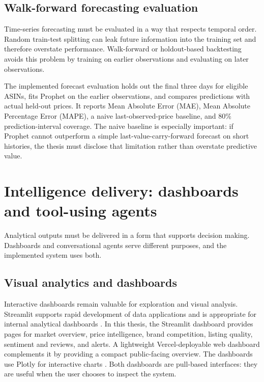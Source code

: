 \subsection{Walk-forward forecasting evaluation}

Time-series forecasting must be evaluated in a way that respects
temporal order. Random train-test splitting can leak future information
into the training set and therefore overstate performance. Walk-forward
or holdout-based backtesting avoids this problem by training on earlier
observations and evaluating on later observations.

The implemented forecast evaluation holds out the final three days for
eligible ASINs, fits Prophet on the earlier observations, and compares
predictions with actual held-out prices. It reports Mean Absolute Error
(MAE), Mean Absolute Percentage Error (MAPE), a naive last-observed-price
baseline, and 80\% prediction-interval coverage. The naive baseline is
especially important: if Prophet cannot outperform a simple
last-value-carry-forward forecast on short histories, the thesis must
disclose that limitation rather than overstate predictive value.

\section{Intelligence delivery: dashboards and tool-using agents}

Analytical outputs must be delivered in a form that supports decision
making. Dashboards and conversational agents serve different purposes,
and the implemented system uses both.

\subsection{Visual analytics and dashboards}

Interactive dashboards remain valuable for exploration and visual
analysis. Streamlit supports rapid development of data applications and
is appropriate for internal analytical dashboards \citep{streamlit2024docs}.
In this thesis, the Streamlit dashboard provides pages for market
overview, price intelligence, brand competition, listing quality,
sentiment and reviews, and alerts. A lightweight Vercel-deployable web
dashboard complements it by providing a compact public-facing overview.
The dashboards use Plotly for interactive charts \citep{plotly2024docs}.
Both dashboards are pull-based interfaces: they are useful when the user
chooses to inspect the system.

